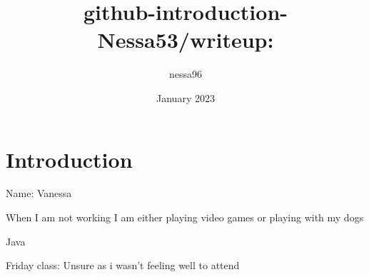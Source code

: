\documentclass{article}
\title{github-introduction-Nessa53/writeup:}
\author{nessa96 }
\date{January 2023}
\begin{document}
\maketitle

\section{Introduction}
Name: Vanessa

When I am not working I am either playing video games or playing with my dogs

Java

Friday class: Unsure as i wasn't feeling well to attend
\end{document}
